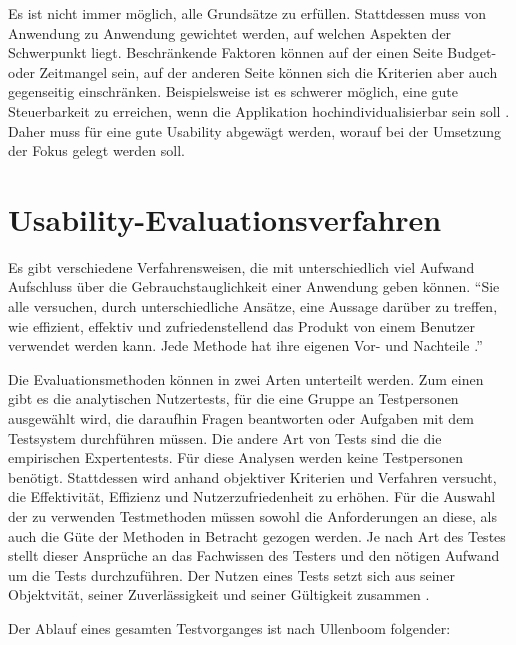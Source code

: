 Es ist nicht immer möglich, alle Grundsätze zu erfüllen. Stattdessen muss von Anwendung zu Anwendung gewichtet werden, auf welchen Aspekten der Schwerpunkt liegt. Beschränkende Faktoren können auf der einen Seite Budget- oder Zeitmangel sein, auf der anderen Seite können sich die Kriterien aber auch gegenseitig einschränken. Beispielsweise ist es schwerer möglich, eine gute Steuerbarkeit zu erreichen, wenn die Applikation hochindividualisierbar sein soll \cite{DIN2006}. Daher muss für eine gute Usability abgewägt werden, worauf bei der Umsetzung der Fokus gelegt werden soll.

\section{Usability-Evaluationsverfahren} \label{sec:methods}
Es gibt verschiedene Verfahrensweisen, die mit unterschiedlich viel Aufwand Aufschluss über die Gebrauchstauglichkeit einer Anwendung geben können. \enquote{Sie alle versuchen, durch unterschiedliche Ansätze, eine Aussage darüber zu treffen, wie effizient, effektiv und zufriedenstellend das Produkt von einem Benutzer verwendet werden kann. Jede Methode hat ihre eigenen Vor- und Nachteile \cite[S. 224]{Ullenboom2014}.}\par
Die Evaluationsmethoden können in zwei Arten unterteilt werden. Zum einen gibt es die analytischen Nutzertests, für die eine Gruppe an Testpersonen ausgewählt wird, die daraufhin Fragen beantworten oder Aufgaben mit dem Testsystem durchführen müssen. Die andere Art von Tests sind die die empirischen Expertentests. Für diese Analysen werden keine Testpersonen benötigt. Stattdessen wird anhand objektiver Kriterien und Verfahren versucht, die Effektivität, Effizienz und Nutzerzufriedenheit zu erhöhen. Für die Auswahl der zu verwenden Testmethoden müssen sowohl die Anforderungen an diese, als auch die Güte der Methoden in Betracht gezogen werden. Je nach Art des Testes stellt dieser Ansprüche an das Fachwissen des Testers und den nötigen Aufwand um die Tests durchzuführen. Der Nutzen eines Tests setzt sich aus seiner Objektvität, seiner Zuverlässigkeit und seiner Gültigkeit zusammen \cite[S.224 f.]{Ullenboom2014}.\par
Der Ablauf eines gesamten Testvorganges ist nach Ullenboom folgender:
